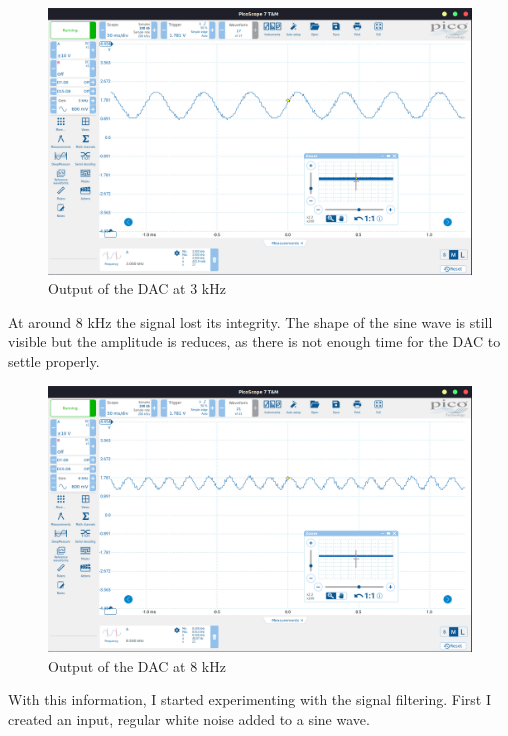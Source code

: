 \begin{figure}[H]
    \centering
    \includegraphics[width=150mm, keepaspectratio]{figures/upperlimit-good.png}
    \caption{Output of the DAC at 3 kHz}
    \label{fig:upperlimit-good}
\end{figure}

At around 8 kHz the signal lost its integrity. The shape of the sine wave is still visible but the amplitude is reduces, as there is not enough time for the DAC to settle properly.

\begin{figure}[H]
    \centering
    \includegraphics[width=150mm, keepaspectratio]{figures/upperlimit-bad.png}
    \caption{Output of the DAC at 8 kHz}
    \label{fig:upperlimit-bad}
\end{figure}

With this information, I started experimenting with the signal filtering. First I created an input, regular white noise added to a sine wave.

